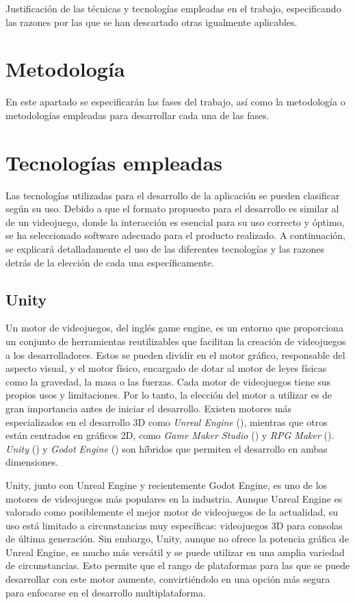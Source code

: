 Justificación de las técnicas y tecnologías empleadas en el trabajo, especificando las razones por las que se han descartado otras igualmente aplicables.

\section{Metodología}

En este apartado se especificarán las fases del trabajo, así como la metodología o metodologías empleadas para desarrollar cada una de las fases. 

\newpage

\section{Tecnologías empleadas}

Las tecnologías utilizadas para el desarrollo de la aplicación se pueden clasificar según su uso. Debido a que el formato propuesto para el desarrollo es similar al de un videojuego, donde la interacción es esencial para su uso correcto y óptimo, se ha seleccionado software adecuado para el producto realizado. A continuación, se explicará detalladamente el uso de las diferentes tecnologías y las razones detrás de la elección de cada una específicamente.

\subsection{Unity}

Un motor de videojuegos, del inglés game engine, es un entorno que proporciona un conjunto de herramientas reutilizables que facilitan la creación de videojuegos a los desarrolladores. Estos se pueden dividir en el motor gráfico, responsable del aspecto visual, y el motor físico, encargado de dotar al motor de leyes físicas como la gravedad, la masa o las fuerzas. Cada motor de videojuegos tiene sus propios usos y limitaciones. Por lo tanto, la elección del motor a utilizar es de gran importancia antes de iniciar el desarrollo. Existen motores más especializados en el desarrollo 3D como \textit{Unreal Engine} (\cite{UE:1998}), mientras que otros están centrados en gráficos 2D, como \textit{Game Maker Studio} (\cite{GMS:1999}) y \textit{RPG Maker} (\cite{RPGM:1992}). \textit{Unity} (\cite{UNITY:2005}) y \textit{Godot Engine} (\cite{GODOT:2001}) son híbridos que permiten el desarrollo en ambas dimensiones.

Unity, junto con Unreal Engine y recientemente Godot Engine, es uno de los motores de videojuegos más populares en la industria. Aunque Unreal Engine es valorado como posiblemente el mejor motor de videojuegos de la actualidad, su uso está limitado a circunstancias muy específicas: videojuegos 3D para consolas de última generación. Sin embargo, Unity, aunque no ofrece la potencia gráfica de Unreal Engine, es mucho más versátil y se puede utilizar en una amplia variedad de circunstancias. Esto permite que el rango de plataformas para las que se puede desarrollar con este motor aumente, convirtiéndolo en una opción más segura para enfocarse en el desarrollo multiplataforma.

